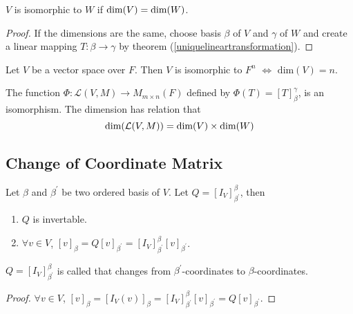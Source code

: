 \begin{theorem}
	$V$ is isomorphic to $W$ if $\displaystyle \text{dim}( V ) = \displaystyle \text{dim}( W )$.
\end{theorem}

\begin{proof}
	If the dimensions are the same, choose basis $\beta$ of $V$ and $\gamma$ of $W$ and create a linear mapping $T:\beta \rightarrow \gamma$ by theorem (\ref{uniquelineartransformation}).
\end{proof}


\begin{theorem}
	Let $V$ be a vector space over $F$. Then $V$ is isomorphic to $F^n$ $\Leftrightarrow$ $\text{dim}(V) = n$.
\end{theorem}


\begin{theorem}
	The function $\Phi: \mathcal{L}(V,M) \rightarrow M_{m \times n}(F)$ defined by $\Phi (T) = [T]_\beta^\gamma$, is an isomorphism. The dimension has relation that 
	\begin{equation}
		\displaystyle \text{dim}( \mathcal{L}(V,M) ) = \displaystyle \text{dim}( V ) \times \displaystyle \text{dim}( W )
	\end{equation}
\end{theorem}


\subsection{Change of Coordinate Matrix}


\begin{theorem}
	Let $\beta$ and $\beta^\prime$ be two ordered basis of $V$. Let $Q = [I_V]_{\beta^\prime}^\beta$, then
	\begin{enumerate}
		\item $Q$ is invertable.
		\item $\forall v \in V$, $[v]_\beta = Q [v]_{\beta^\prime} = [I_V]_{\beta^\prime}^\beta [v]_{\beta^\prime}$.
	\end{enumerate}
	
	$Q= [I_V]_{\beta^\prime}^\beta$ is called  that changes from $\beta^\prime$-coordinates to $\beta$-coordinates.
\end{theorem}

\begin{proof}
    $\forall v \in V $,  $[v]_\beta = [I_V (v)]_\beta =  [I_V]_{\beta^\prime}^\beta [v]_{\beta^\prime} = Q [v]_{\beta^\prime}$.
\end{proof}

